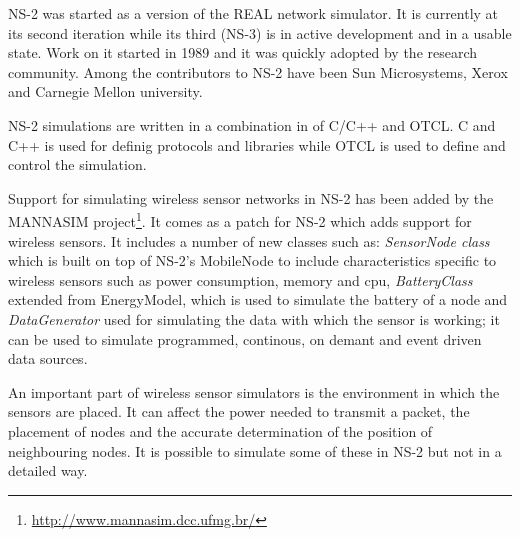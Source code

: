 \label{subsec:ns2}

NS-2 was started as a version of the REAL network simulator. It is currently at its 
second iteration while its third (NS-3) is in active development and in a usable state.
Work on it started in 1989 and it was quickly adopted by the research community.
Among the contributors to NS-2 have been Sun Microsystems, Xerox and Carnegie Mellon 
university. 

NS-2 simulations are written in a combination in of C/C++ and OTCL. C and C++ is 
used for definig protocols and libraries while OTCL is used to define and control
the simulation.

Support for simulating wireless sensor networks in NS-2 has been added by the 
MANNASIM project\footnote{\url{http://www.mannasim.dcc.ufmg.br/}}. It comes as
a patch for NS-2 which adds support for wireless sensors. It includes a number of
new classes such as: \textit{SensorNode class} which is built on top of NS-2's MobileNode 
to include characteristics specific to wireless sensors such as power 
consumption, memory and cpu, \textit{BatteryClass} extended from EnergyModel, 
which is used to simulate
the battery of a node and \textit{DataGenerator} used for simulating the data 
with which the sensor is
working; it can be used to simulate programmed, continous, on demant and event 
driven
data sources.

An important part of wireless sensor simulators is the environment in which the sensors
are placed. It can affect the power needed to transmit a packet, the placement of nodes
and the accurate determination of the position of neighbouring nodes. It is possible to
simulate some of these in NS-2 but not in a detailed way.
